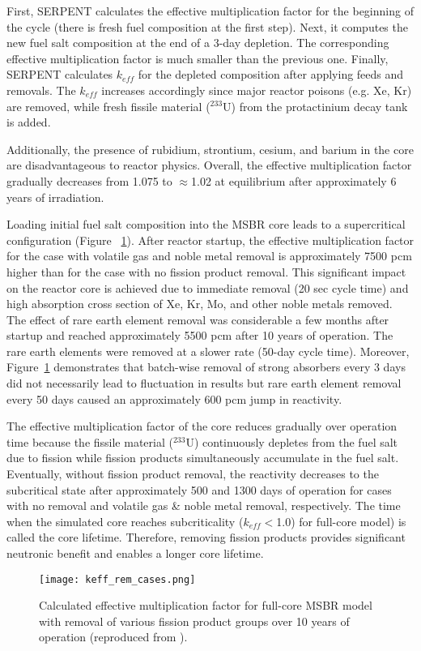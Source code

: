First, SERPENT calculates the effective multiplication factor for the beginning 
of the cycle (there is fresh fuel composition at the first step). Next, it 
computes the new fuel salt composition at the end of a 3-day depletion. The 
corresponding effective multiplication factor is much smaller than the previous 
one. Finally, SERPENT calculates $k_{eff}$ for the depleted composition after 
applying feeds and removals. The $k_{eff}$ increases accordingly since major reactor 
poisons (e.g. Xe, Kr) are removed, while fresh fissile material ($^{233}$U) 
from the protactinium decay tank is added.  

Additionally, the presence of rubidium, strontium, cesium, and barium in the 
core are disadvantageous to reactor physics. 
Overall, the effective multiplication factor gradually decreases from 1.075 to 
$\approx$1.02 at equilibrium after approximately 6 years of irradiation. 

Loading initial fuel salt composition into the \gls{MSBR} core leads to a 
supercritical configuration (Figure ~\ref{fig:fp_removal}). After reactor 
startup, the effective multiplication factor for the case with volatile gas 
and noble metal removal is approximately 7500 pcm  higher than for the case with 
no fission product removal. This significant impact on the reactor core is
achieved due to immediate removal (20 sec cycle time) and high absorption cross 
section of Xe, Kr, Mo, and other noble metals removed. The effect of rare earth 
element removal was considerable a few months after startup and reached 
approximately 5500 pcm after 10 years of operation. The rare earth elements were 
removed at a slower rate (50-day cycle time). Moreover, 
Figure~\ref{fig:fp_removal} demonstrates that batch-wise removal of strong 
absorbers every 3 days did not necessarily lead to fluctuation in results 
but rare earth element removal every 50 days caused an approximately 600 pcm jump 
in reactivity.

The effective multiplication factor of the core reduces gradually over 
operation time because the fissile material ($^{233}$U) continuously depletes 
from the fuel salt due to fission while fission products simultaneously
accumulate in the fuel salt. Eventually, without fission product removal, 
the reactivity decreases to the subcritical state after approximately 500 and 
1300 days of operation for cases with no removal and volatile gas \& noble 
metal removal, respectively. The time when the simulated core reaches 
subcriticality ($k_{eff}<$1.0) for full-core model) is called the core lifetime. 
Therefore, removing fission products provides significant neutronic benefit 
and enables a longer core lifetime.
\begin{figure}[ht!] %
  \centering
  \texttt{[image: keff\_rem\_cases.png]} 
  \caption{Calculated effective multiplication factor for full-core \gls{MSBR} 
model with removal of various fission product groups over 10 years of 
operation (reproduced from \cite{rykhlevskii_modeling_2019}).}
  \label{fig:fp_removal}
\end{figure}

